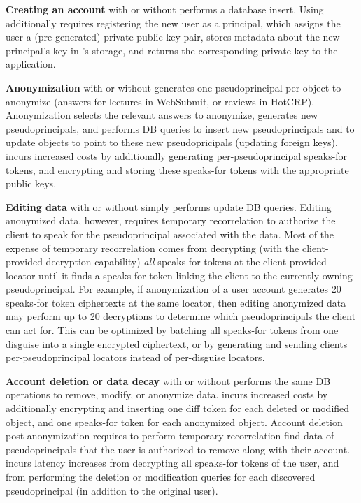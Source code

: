 \textbf{Creating an account} with or without \sys performs a database insert. Using \sys additionally
requires registering the new user as a principal, which assigns the user a (pre-generated)
private-public key pair, stores metadata about the new principal's key in \sys's storage, and
returns the corresponding private key to the application.

\textbf{Anonymization} with or without \sys generates one pseudoprincipal per object to anonymize
(\eg answers for lectures in WebSubmit, or reviews in HotCRP). Anonymization selects the relevant answers
to anonymize, generates new pseudoprincipals, and performs DB queries to insert new pseudoprincipals
and to update objects to point to these new pseudopricipals (\eg updating foreign keys).
\sys incurs increased costs by additionally generating per-pseudoprincipal speaks-for tokens, and 
encrypting and storing these speaks-for tokens with the appropriate public keys.

\textbf{Editing data} with or without \sys simply performs update DB queries. Editing anonymized data,
however, requires temporary recorrelation to authorize the client to speak for the pseudoprincipal
associated with the data.  Most of the expense of temporary recorrelation comes from \sys decrypting
(with the client-provided decryption capability) \emph{all} speaks-for tokens at the client-provided
locator until it finds a speaks-for token linking the client to the currently-owning pseudoprincipal.
For example, if anonymization of a user account generates 20 speaks-for token ciphertexts at the same
locator, then editing anonymized data may perform up to 20 decryptions to
determine which pseudoprincipals the client can act for. This can be optimized by batching all
speaks-for tokens from one disguise into a single encrypted ciphertext, or by generating and sending
clients per-pseudoprincipal locators instead of per-disguise locators.

\textbf{Account deletion or data decay} with or without \sys performs the same DB operations to
remove, modify, or anonymize data.  \sys incurs increased costs by additionally encrypting and
inserting one diff token for each deleted or modified object, and one speaks-for token for each
anonymized object.  Account deletion post-anonymization requires \sys to perform temporary
recorrelation find data of pseudoprincipals that the user is authorized to remove along with their
account.  \sys incurs latency increases from decrypting all speaks-for tokens of the user, and from
performing the deletion or modification queries for each discovered pseudoprincipal (in addition to
the original user).

